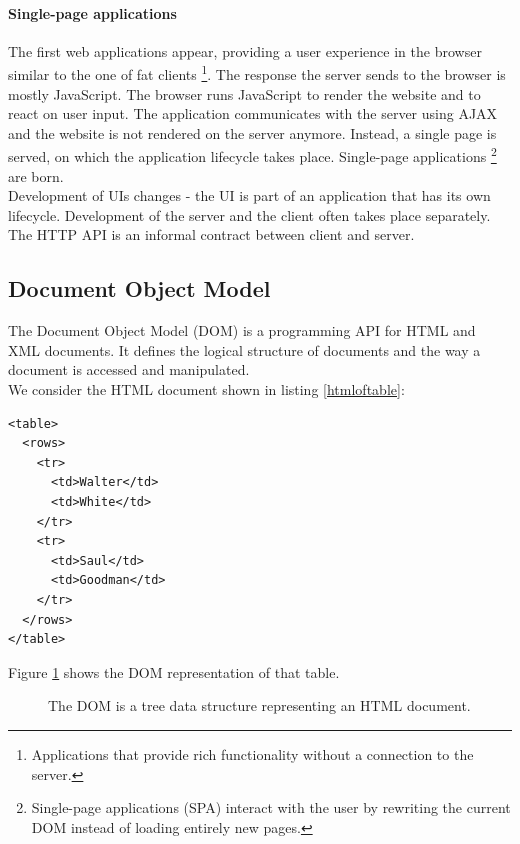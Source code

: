 \paragraph{Single-page applications} The first web applications appear, providing a user experience in the browser similar to the one of fat clients \footnote{Applications that provide rich functionality without a connection to the server.}. The response the server sends to the browser is mostly JavaScript. The browser runs JavaScript to render the website and to react on user input. The application communicates with the server using AJAX and the website is not rendered on the server anymore. Instead, a single page is served, on which the application lifecycle takes place. Single-page applications \footnote{Single-page applications (SPA) interact with the user by rewriting the current DOM instead of loading entirely new pages.} are born.
\\ Development of UIs changes - the UI is part of an application that has its own lifecycle. Development of the server and the client often takes place separately. The HTTP API is an informal contract between client and server.

\subsection{Document Object Model}\label{documentobjectmodel}
The Document Object Model (DOM) is a programming API for HTML and XML documents. It defines the logical structure of documents and the way a document is accessed and manipulated. \citep{domintro} \\ We consider the HTML document shown in listing \ref{htmloftable}:

\lstset{language=XML}
\begin{lstlisting}[caption=HTML document of a table, label=htmloftable]
<table>
  <rows>
    <tr>
      <td>Walter</td>
      <td>White</td>
    </tr>
    <tr>
      <td>Saul</td>
      <td>Goodman</td>
    </tr>
  </rows>
</table>
\end{lstlisting}

Figure \ref{fig:dom} shows the DOM representation of that table.

\begin{figure}[!htb]
  \caption{The DOM is a tree data structure representing an HTML document.}
  \label{fig:dom}
\end{figure}

